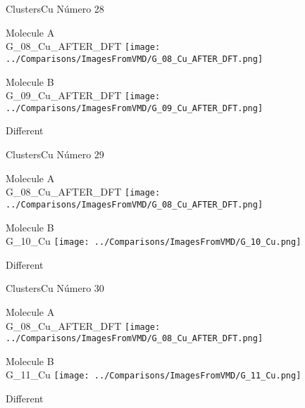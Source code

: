  \newpage

\vtab[-3cm]
\begin{center}
{\large ClustersCu \tab Número 28}
\end{center}
\begin{multicols}{2}
\begin{center}
Molecule A \\ 
G\_08\_Cu\_AFTER\_DFT
\texttt{[image: ../Comparisons/ImagesFromVMD/G\_08\_Cu\_AFTER\_DFT.png]}
\\
\vtab

\columnbreak
Molecule B \\ 
G\_09\_Cu\_AFTER\_DFT
\texttt{[image: ../Comparisons/ImagesFromVMD/G\_09\_Cu\_AFTER\_DFT.png]}
\\
\vtab


\end{center}
\end{multicols}
\begin{center}
\textcolor{NavyBlue}{\Large Different}
\end{center}

 \newpage

\vtab[-3cm]
\begin{center}
{\large ClustersCu \tab Número 29}
\end{center}
\begin{multicols}{2}
\begin{center}
Molecule A \\ 
G\_08\_Cu\_AFTER\_DFT
\texttt{[image: ../Comparisons/ImagesFromVMD/G\_08\_Cu\_AFTER\_DFT.png]}
\\
\vtab

\columnbreak
Molecule B \\ 
G\_10\_Cu
\texttt{[image: ../Comparisons/ImagesFromVMD/G\_10\_Cu.png]}
\\
\vtab


\end{center}
\end{multicols}
\begin{center}
\textcolor{NavyBlue}{\Large Different}
\end{center}

 \newpage

\vtab[-3cm]
\begin{center}
{\large ClustersCu \tab Número 30}
\end{center}
\begin{multicols}{2}
\begin{center}
Molecule A \\ 
G\_08\_Cu\_AFTER\_DFT
\texttt{[image: ../Comparisons/ImagesFromVMD/G\_08\_Cu\_AFTER\_DFT.png]}
\\
\vtab

\columnbreak
Molecule B \\ 
G\_11\_Cu
\texttt{[image: ../Comparisons/ImagesFromVMD/G\_11\_Cu.png]}
\\
\vtab


\end{center}
\end{multicols}
\begin{center}
\textcolor{NavyBlue}{\Large Different}
\end{center}

